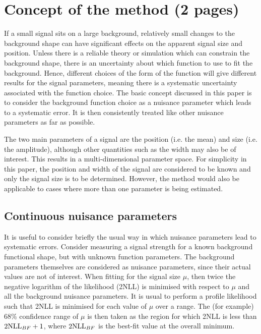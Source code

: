 \section{Concept of the method (2 pages)}
\label{sec:concept}

If a small signal sits on
a large background, relatively small changes to the background shape can
have significant effects on the apparent signal size and position.
Unless there is a
reliable theory or simulation which can constrain the background shape,
there is an uncertainty about which function to use to fit
the background. Hence, different choices of the form of the function
will give different results for the signal parameters, meaning there is a
systematic uncertainty associated with the function choice.
The basic concept discussed in this paper is to consider the background
function choice as a nuisance parameter which leads to a systematic error.
It is then consistently treated like other nuisance parameters as far as
possible.

The two main parameters of a signal are the position (i.e. the mean)
and size (i.e. the amplitude), although other
quantities such as the width may also be of interest. This results in a
multi-dimensional parameter space. For simplicity in this paper, the position
and width of the signal are considered to be known and only the signal
size is to be determined. However, the method would also be applicable to
cases where more than one parameter is being estimated.

\subsection{Continuous nuisance parameters}
\label{sec:concept:continuous}

It is useful to consider briefly the usual way in which nuisance 
parameters lead to systematic errors. Consider measuring a signal
strength for a known background functional shape, but with unknown function
parameters. The background parameters themselves are considered as
nuisance parameters, since their actual values are not of interest.
When fitting for the signal size $\mu$, then twice the negative logarithm of the
likelihood (2NLL) is minimised with respect to $\mu$ and all the background
nuisance parameters. It is usual to perform a profile likelihood
such that 2NLL is minimised for each value of $\mu$ over a range. 
The (for example) 68\% confidence range of $\mu$ 
is then
taken as the region for which 2NLL is less than ${\rm 2NLL}_{BF}+1$,
where ${\rm 2NLL}_{BF}$ is the best-fit value at the overall minimum.

